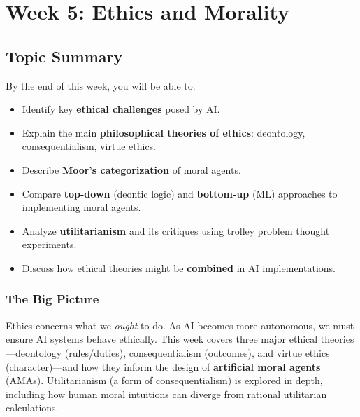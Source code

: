 \section{Week 5: Ethics and Morality}

\subsection{Topic Summary}

\begin{keybox}
By the end of this week, you will be able to:
\begin{itemize}
  \item Identify key \textbf{ethical challenges} posed by AI.
  \item Explain the main \textbf{philosophical theories of ethics}: deontology, consequentialism, virtue ethics.
  \item Describe \textbf{Moor's categorization} of moral agents.
  \item Compare \textbf{top-down} (deontic logic) and \textbf{bottom-up} (ML) approaches to implementing moral agents.
  \item Analyze \textbf{utilitarianism} and its critiques using trolley problem thought experiments.
  \item Discuss how ethical theories might be \textbf{combined} in AI implementations.
\end{itemize}
\end{keybox}

\separator

\subsubsection*{The Big Picture}

Ethics concerns what we \textit{ought} to do. As AI becomes more autonomous, we must ensure AI systems behave ethically. This week covers three major ethical theories---deontology (rules/duties), consequentialism (outcomes), and virtue ethics (character)---and how they inform the design of \textbf{artificial moral agents} (AMAs). Utilitarianism (a form of consequentialism) is explored in depth, including how human moral intuitions can diverge from rational utilitarian calculations.

